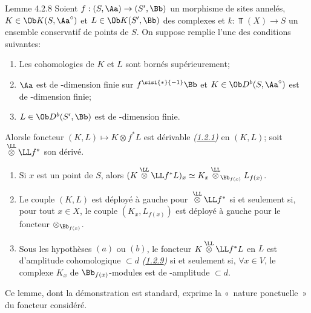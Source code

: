 \documentclass[10pt]{../fichiers-configuration-latex/smfart}
\begin{document}
\begin{enonce*}{Lemme 4.2.8}
Soient $f:(S,\Aa)\rightarrow (S',\Bb)$ un morphisme de
sites annelés, $K\in \Ob K(S,\Aa^{\circ})$ et $L\in \Ob
K(S',\Bb)$ des complexes et $k:\Top(X)\rightarrow S$ un
ensemble conservatif de points de $S$. On suppose remplie l'une des
conditions suivantes:
\begin{enumerate}
\renewcommand{\theenumi}{\alph{enumi}}
\renewcommand{\labelenumi}{(\theenumi)}
\item Les cohomologies de $K$ et $L$ sont bornés supérieurement;

\item $\Aa$ est de \tTor-dimension finie sur
$f^{\sisi{\ast}{-1}}\Bb$ et $K\in \Ob D^{b}(S,\Aa^{\circ})$ est
de \tTor-dimension finie;

\item $L\in \Ob D^{b}(S',\Bb)$ est de \tTor-dimension finie.
\end{enumerate}

Alors\pageoriginale le foncteur $(K,L)\mapsto K\otimes f^{\ast}L$ est
dérivable \emph{(\hyperref[XVII.def1.2.1]{1.2.1})} en $(K,L)$; soit
${}\overset{\LL}{\otimes}\LL f^{\ast}$ son dérivé.
\begin{enumerate}
\renewcommand{\theenumi}{\roman{enumi}}
\renewcommand{\labelenumi}{(\theenumi)}
\item Si $x$ est un point de $S$, alors
$(K\overset{\LL}{\otimes}\LL f^{\ast}L)_x\simeq
K_x\overset{\LL}{\otimes}_{\Bb_{f(x)}}L_{f(x)}$.

\item Le couple $(K,L)$ est déployé à gauche pour
${}\overset{\LL}{\otimes}\LL f^{\ast}$  si et
seulement si, pour tout $x\in X$, le couple $(K_x,L_{f(x)})$ est
déployé à gauche pour le foncteur $\otimes_{\Bb_{f(x)}}$.

\item Sous les hypothèses $(a)$ ou $(b)$, le foncteur
$K\overset{\LL}{\otimes}\LL f^{\ast}L$ en $L$ est
d'amplitude cohomologique $\subset d$ \emph{(\hyperref[XVII.def1.2.9]{1.2.9})} si et seulement si,
$\forall x \in V$, le complexe $K_x$ de
$\Bb_{f(x)}$-modules est de \tTor-amplitude $\subset d$.
\end{enumerate}
\end{enonce*}

Ce lemme, dont la démonstration est standard, exprime la « nature
ponctuelle »  du foncteur considéré.
\end{document}
